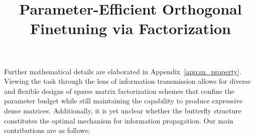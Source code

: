 \title{Parameter-Efficient Orthogonal Finetuning via Factorization}
Further mathematical details are elaborated in Appendix~\ref{app:sn_property}. Viewing the task through the lens of information transmission allows for diverse and flexible designs of sparse matrix factorization schemes that confine the parameter budget while still maintaining the capability to produce expressive dense matrices. Additionally, it is yet unclear whether the butterfly structure constitutes the optimal mechanism for information propagation. Our main contributions are as follows:

